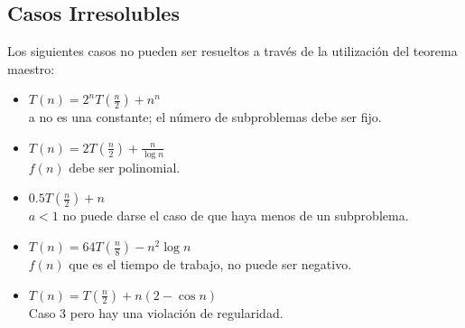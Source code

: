 \documentclass{article}
\begin{document}
\subsection{Casos Irresolubles}
Los siguientes casos no pueden ser resueltos a través de la utilización del teorema maestro: \cite{anonymous2006}\\
\begin{itemize}
    \item $T(n)=2^{n}T(\frac{n}{2})+n^n$\\
    a no es una constante; el número de subproblemas debe ser fijo.\\
    \item $T(n)=2T(\frac{n}{2})+\frac{n}{\log{n}}$\\
    $f(n)$ debe ser polinomial.\\
    \item $0.5T(\frac{n}{2})+n$\\
    $a<1$  no puede darse el caso de que haya menos de un subproblema.\\
    \item $T(n)=64T(\frac{n}{8})-n^{2}\log{n}$\\
    $f(n)$ que es el tiempo de trabajo, no puede ser negativo.\\
    \item $T(n)=T(\frac{n}{2})+n(2-\cos{n})$\\
    Caso 3 pero hay una violación de regularidad.
\end{itemize}
\printbibliography[title = {Referencias}]
\end{document}
